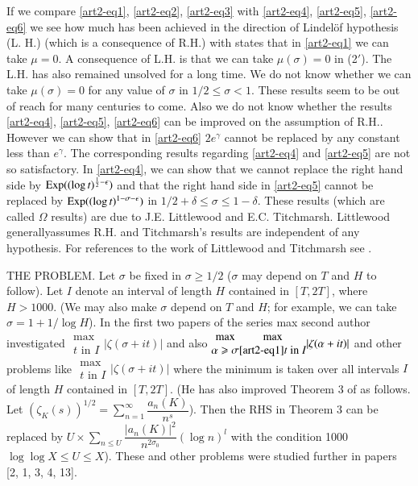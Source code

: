 If we compare \eqref{art2-eq1}, \eqref{art2-eq2}, \eqref{art2-eq3} with \eqref{art2-eq4}, \eqref{art2-eq5}, \eqref{art2-eq6} we see how much has been achieved in the direction of Lindel\"of hypothesis (L. H.) (which is a consequence of R.H.) with states that in \eqref{art2-eq1} we can take $\mu=0$. A consequence of L.H. is that we can take $\mu(\sigma) = 0$ in (2$'$). The L.H. has also remained unsolved for a long time. We do not know whether we can take $\mu(\sigma)=0$ for any value of $\sigma$ in $1/2 \leqslant \sigma < 1$. These results seem to be out of reach for many centuries to come. Also we do not know whether the results \eqref{art2-eq4}, \eqref{art2-eq5}, \eqref{art2-eq6} can be improved on the assumption of R.H.. However we can show that in \eqref{art2-eq6} $2e^\gamma$ cannot be replaced by any constant less than $e^\gamma$. The corresponding results regarding \eqref{art2-eq4} and \eqref{art2-eq5} are not so satisfactory. In \eqref{art2-eq4}, we can show that we cannot replace the right hand side by $\operatorname{Exp} ((\log t)^{\frac{1}{2}- \epsilon})$  and that the right hand side in \eqref{art2-eq5} cannot be replaced by $\operatorname{Exp} ((\log t)^{1-\sigma -\epsilon})$ in $1/2 + \delta \leqslant \sigma \leqslant 1 -\delta$. These results (which are called $\Omega$ results) are due to J.E. Littlewood and E.C. Titchmarsh. Littlewood generally\pageoriginale assumes R.H. and Titchmarsh's results are independent of any hypothesis. For references to the work of Littlewood and Titchmarsh see \cite{art2-key19}.

\medskip
\noindent
THE PROBLEM. Let $\sigma$ be fixed in $\sigma \geqslant 1/2$ ($\sigma$ may depend on $T$ and $H$ to follow). Let $I$ denote an interval of length $H$ contained in $[T, 2T]$, where $H > 1000$. (We may also make $\sigma$ depend on $T$ and $H$; for example, we can take $\sigma =1 +1 /\log H$). In the first two papers \cite{art2-key11, art2-key12} of the series max second author investigated $\begin{matrix} \max \\  t \text{ in } I\end{matrix} |\zeta(\sigma + it)|$ and also $\begin{matrix} \max\\ \alpha \geqslant \sigma 
\end{matrix} \begin{matrix}
\max\\\eqref{art2-eq1}
t \text{ in } I
\end{matrix} |\zeta(\alpha + it)|$ and other problems like $\begin{matrix}
\max\\
t \text{ in } I
\end{matrix} |\zeta(\sigma + it)|$ where the minimum is taken over all intervals $I$ of length $H$ contained in $[T, 2T]$. (He has also improved Theorem 3 of \cite{art2-key11} as follows. Let $(\zeta_K(s))^{1/2} = \sum\limits^\infty_{n=1} \dfrac{a_n(K)}{n^s}$). Then the RHS in Theorem 3 can be replaced by $U \times \sum\limits_{n \leqslant U} \dfrac{|a_n(K)|^2}{n^{2\sigma_0}} (\log n)^l$  with the condition 1000 $\log \log X \leqslant U \leqslant X$). These and other problems were studied further in papers [2, 1, 3, 4, 13].

